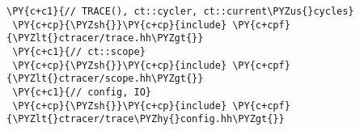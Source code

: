  {\footnotesize
 \begin{Verbatim}[commandchars=\\\{\}]
 \PY{c+c1}{// TRACE(), ct::cycler, ct::current\PYZus{}cycles}
 \PY{c+cp}{\PYZsh{}}\PY{c+cp}{include} \PY{c+cpf}{\PYZlt{}ctracer/trace.hh\PYZgt{}}
 \PY{c+c1}{// ct::scope}
 \PY{c+cp}{\PYZsh{}}\PY{c+cp}{include} \PY{c+cpf}{\PYZlt{}ctracer/scope.hh\PYZgt{}}
 \PY{c+c1}{// config, IO}
 \PY{c+cp}{\PYZsh{}}\PY{c+cp}{include} \PY{c+cpf}{\PYZlt{}ctracer/trace\PYZhy{}config.hh\PYZgt{}}
 \end{Verbatim}
 }
